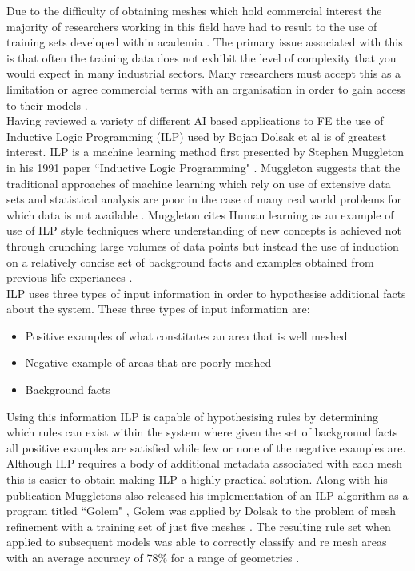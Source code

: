 \noindent
Due to the difficulty of obtaining meshes which hold commercial interest the majority of researchers working in this field have had to result to the use of training sets developed within academia \cite{DolsakPaper91}. The primary issue associated with this is that often the training data does not exhibit the level of complexity that you would expect in many industrial sectors. Many researchers must accept this as a limitation or agree commercial terms with an organisation in order to gain access to their models \cite{DittmerMeshQualityMet}.\\ 

\noindent
Having reviewed a variety of different AI based applications to FE the use of Inductive Logic Programming (ILP) used by Bojan Dolsak et al is of greatest interest. ILP is a machine learning method first presented by Stephen Muggleton in his 1991 paper ``Inductive Logic Programming" \cite{MuggletonILP}. Muggleton suggests that the traditional approaches of machine learning which rely on use of extensive data sets and statistical analysis are poor in the case of many real world problems for which data is not available \cite{ILPYoutubeLecture}. Muggleton cites Human learning as an example of use of ILP style techniques where understanding of new concepts is achieved not through crunching large volumes of data points but instead  the use of induction on a relatively concise set of background facts and examples obtained from previous life experiances \cite{ILPYoutubeLecture}. \\ 

\noindent
ILP uses three types of input information in order to hypothesise additional facts about the system. These three types of input information are: \\ 

\begin{itemize}
\item Positive examples  of what constitutes an area that is well meshed
\item Negative example of areas that are poorly meshed
\item Background facts
\end{itemize}

\noindent
Using this information ILP is capable of hypothesising rules by determining which rules can exist within the system where given the set of background facts all positive examples are satisfied while few or none of the negative examples are. Although ILP requires a body of additional metadata associated with each mesh this is easier to obtain making ILP a highly practical solution. Along with his publication Muggletons also released his implementation of an ILP algorithm as a program titled ``Golem" \cite{Golem}, Golem was applied by Dolsak to the problem of mesh refinement with a training set of just five meshes \cite{DolsakPaper94}. The resulting rule set when applied to subsequent models was able to correctly classify and re mesh areas with an average accuracy of 78\% for a range of geometries \cite{DolsakPaper94} \cite{appOfILPToFEMeshDesign}. \\

